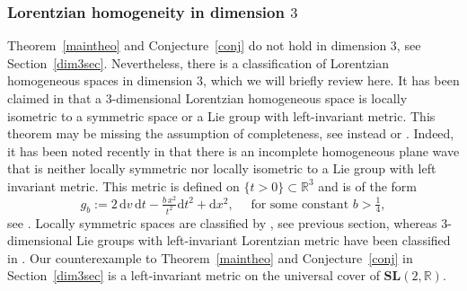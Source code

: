 \documentclass[11pt,a4paper]{amsart}
\newcommand{\+}{\oplus}
\newcommand{\so}{\mathfrak{so}}
\newcommand{\SL}{\mathbf{SL}}
\newcommand{\1}{\mathbf{1}}
\renewcommand{\d}{\mathrm{d}}
\newcommand{\R}{\mathbb{R}} %
\newcommand{\<}{\langle}
\renewcommand{\>}{\rangle}
\theoremstyle{definition}
\theoremstyle{plain}
\numberwithin{equation}{section}
\begin{document}
\subsubsection{Lorentzian homogeneity in dimension $3$}
\label{dim3sec0}
Theorem~\ref{maintheo} and Conjecture~\ref{conj} do not hold in dimension $3$, see Section~\ref{dim3sec}. Nevertheless, there is a classification of Lorentzian homogeneous spaces in dimension $3$, which we will briefly review here. It has been claimed in \cite[Theorem 3.1]{calvaruso07homog} that a $3$-dimensional Lorentzian homogeneous space is locally isometric to a symmetric space or a Lie group with left-invariant metric. 
This theorem may be missing the assumption of completeness, see \cite[Theorem 1.1]{calvaruso07homog} instead or
\cite[Theorem 4.3.3]{CalvarusoCastrillon-Lopez19}. Indeed,
 it has been noted recently in \cite[Theorem 1.6]{AlloutBelkacemZeghib23}
that there is an incomplete homogeneous plane wave that is neither locally symmetric nor locally isometric to a Lie group with left invariant metric. This metric is defined on $\{t>0\}\subset \R^3$ and is of the form
\[g_b:=2\, \d v\,\d t- \tfrac{ b\,x^2}{t^2} \d t^2 +\d x^2,\quad\text{ for some constant $b>\tfrac{1}{4}$},\]
 see  \cite[Theorem 1.3]{AlloutBelkacemZeghib23}. 
  Locally symmetric spaces are classified by \cite{cahen-wallach70}, see previous section, whereas  $3$-dimensional Lie groups with left-invariant Lorentzian metric have been classified in \cite{Rahmani92}. Our counterexample to Theorem~\ref{maintheo} and Conjecture~\ref{conj}  in Section~\ref{dim3sec} is a left-invariant metric on the universal cover of $\SL(2,\R)$.
%
%
\end{document}
